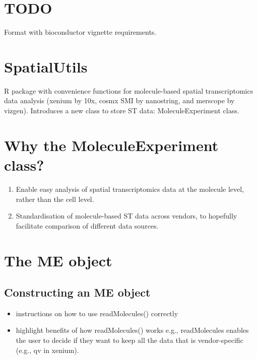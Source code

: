 \documentclass[
]{article}
\author{}
\date{\vspace{-2.5em}}
\providecommand{\tightlist}{%
  \setlength{\itemsep}{0pt}\setlength{\parskip}{0pt}}
\begin{document}
\hypertarget{todo}{%
\section{TODO}\label{todo}}

Format with bioconductor vignette requirements.

\hypertarget{spatialutils}{%
\section{SpatialUtils}\label{spatialutils}}

R package with convenience functions for molecule-based spatial
transcriptomics data analysis (xenium by 10x, cosmx SMI by nanostring,
and merscope by vizgen). Introduces a new class to store ST data:
MoleculeExperiment class.

\hypertarget{why-the-moleculeexperiment-class}{%
\section{Why the MoleculeExperiment
class?}\label{why-the-moleculeexperiment-class}}

\begin{enumerate}
\def\labelenumi{\arabic{enumi})}
\tightlist
\item
  Enable easy analysis of spatial transcriptomics data at the molecule
  level, rather than the cell level.
\item
  Standardisation of molecule-based ST data across vendors, to hopefully
  facilitate comparison of different data sources.
\end{enumerate}

\hypertarget{the-me-object}{%
\section{The ME object}\label{the-me-object}}

\hypertarget{constructing-an-me-object}{%
\subsection{Constructing an ME object}\label{constructing-an-me-object}}

\begin{itemize}
\tightlist
\item
  instructions on how to use readMolecules() correctly
\item
  highlight benefits of how readMolecules() works e.g., readMolecules
  enables the user to decide if they want to keep all the data that is
  vendor-specific (e.g., qv in xenium).
\end{itemize}
\end{document}
